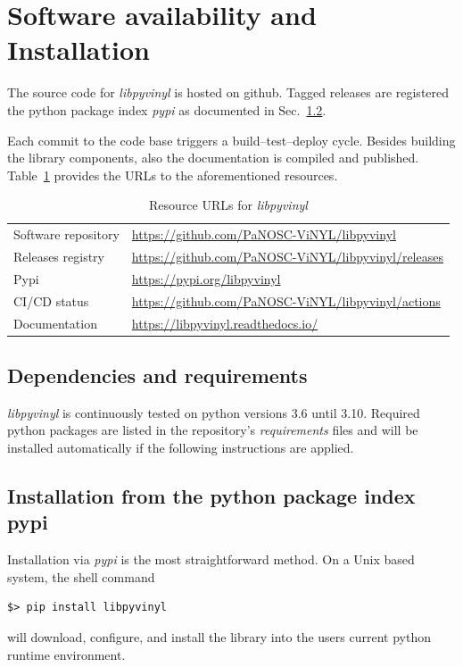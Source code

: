 \documentclass[10pt]{scrartcl}
\begin{document}
\section{Software availability and Installation}
\label{sec:installation}
The source code for \textit{libpyvinyl} is hosted on github.
Tagged releases are registered 
the python package index \textit{pypi} as documented in Sec.~\ref{sec:pypi}.

Each commit to the code base triggers a build--test--deploy cycle. 
Besides building the library components, also the documentation is compiled
and published. Table~\ref{tab:links} provides the URLs to the aforementioned
resources.

\begin{table}[ht]
  \centering
  \begin{tabular}{l|l}
 Software repository &   \url{https://github.com/PaNOSC-ViNYL/libpyvinyl} \\
 Releases registry &   \url{https://github.com/PaNOSC-ViNYL/libpyvinyl/releases} \\
 Pypi & \url{https://pypi.org/libpyvinyl} \\
 CI/CD status &   \url{https://github.com/PaNOSC-ViNYL/libpyvinyl/actions} \\
 Documentation &    \url{https://libpyvinyl.readthedocs.io/}
  \end{tabular}
  \caption{Resource URLs for \textit{libpyvinyl}}
  \label{tab:links}
\end{table}
 

\subsection{Dependencies and requirements}
\label{sec:dep}

\textit{libpyvinyl} is continuously tested on python versions 3.6 until 3.10.
Required python packages are listed in the repository's \textit{requirements}
files and will be installed automatically if the following instructions are applied.

\subsection{Installation from the python package index pypi}
\label{sec:pypi}

Installation via \textit{pypi} is the most straightforward method. On a Unix based
system, the shell command
\begin{verbatim}
$> pip install libpyvinyl
\end{verbatim}
will download, configure, and install the library into the users current python
runtime environment.
\end{document}
